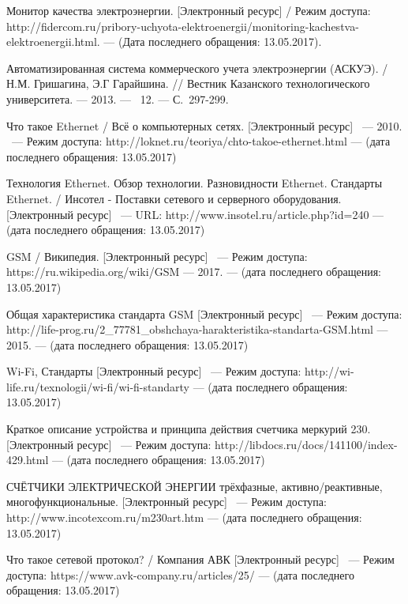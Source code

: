 \documentclass[utf8x,14pt, coursreport]{G7-32}
\begin{document}
\begin{thebibliography}{99}

 Монитор качества электроэнергии. [Электронный ресурс] /  Режим доступа: http://fidercom.ru/pribory-uchyota-elektroenergii/monitoring-kachestva-\\elektroenergii.html. --- (Дата последнего обращения: 13.05.2017).

 Автоматизированная система коммерческого учета электроэнергии (АСКУЭ). / Н.М. Гришагина, Э.Г Гарайшина. // Вестник Казанского технологического университета. --- 2013. --- \No~12. --- С.~297-299.

 Что такое Ethernet / Всё о компьютерных сетях. [Электронный ресурс] ~--- 2010. ~--- Режим доступа: http://loknet.ru/teoriya/chto-takoe-ethernet.html --- (дата последнего обращения: 13.05.2017)

 Технология Ethernet. Обзор технологии. Разновидности Ethernet. Стандарты Ethernet. / Инсотел - Поставки сетевого и серверного оборудования. [Электронный ресурс] ~--- URL: http://www.insotel.ru/article.php?id=240 --- (дата последнего обращения: 13.05.2017)

 GSM / Википедия. [Электронный ресурс] ~--- Режим доступа: https://ru.wikipedia.org/wiki/GSM --- 2017. --- (дата последнего обращения: 13.05.2017)

 Общая характеристика стандарта GSM [Электронный ресурс] ~--- Режим доступа: http://life-prog.ru/2\_77781\_obshchaya-harakteristika-standarta-GSM.html  --- 2015. --- (дата последнего обращения: 13.05.2017)

 Wi-Fi, Стандарты [Электронный ресурс] ~--- Режим доступа: http://wi-life.ru/texnologii/wi-fi/wi-fi-standarty --- (дата последнего обращения: 13.05.2017)

 Краткое описание устройства и принципа действия счетчика меркурий 230. [Электронный ресурс] ~--- Режим доступа: http://libdocs.ru/docs/141100/index-429.html --- (дата последнего обращения: 13.05.2017)

 СЧЁТЧИКИ ЭЛЕКТРИЧЕСКОЙ ЭНЕРГИИ 
трёхфазные, активно/реактивные, многофункциональные. [Электронный ресурс] ~--- Режим доступа: http://www.incotexcom.ru/m230art.htm --- (дата последнего обращения: 13.05.2017)

 Что такое сетевой протокол? / Компания АВК [Электронный ресурс] ~--- Режим доступа: https://www.avk-company.ru/articles/25/ --- (дата последнего обращения: 13.05.2017)


\end{thebibliography}
\end{document}
